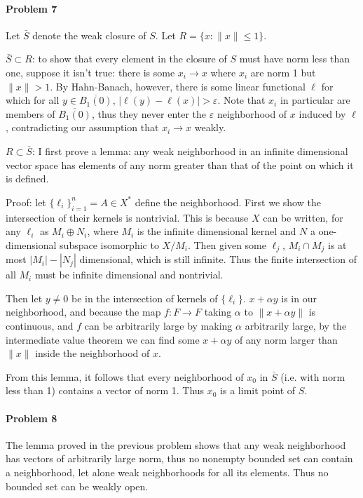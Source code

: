 \documentclass[12pt]{article}
\begin{document}
\paragraph{Problem 7}

Let $\bar{S}$ denote the weak closure of $S$. Let $R = \{x:\|x\| \leq 1\}$.

$\bar{S}\subset R$: to show that every element in the closure of $S$ must have
norm less than one, suppose it isn't true: there is some $x_i \to x$ where
$x_i$ are norm 1 but $\|x\| > 1$. By Hahn-Banach, however, there is some linear
functional $\ell$ for which for all $y \in \overline{B_1(0)}$, $|\ell(y)-\ell(x)
| > \varepsilon$. Note that $x_i$ in particular are members of $\overline{B_1(0)}
$, thus they never enter the $\varepsilon$ neighborhood of $x$ induced by $\ell$,
contradicting our assumption that $x_i\to x$ weakly.

$R\subset \bar{S}$: I first prove a lemma: any weak neighborhood in an infinite
dimensional vector space has elements
of any norm greater than that of the point on which it is defined.

Proof: let $\{\ell_i\}_{i=1}^n = A \in X^*$ define the neighborhood. First we
show the intersection of their kernels is nontrivial. This is because $X$ can
be written, for any $\ell_i$ as $M_i \oplus N_i$, where $M_i$ is the infinite
dimensional kernel and $N$ a one-dimensional subspace isomorphic to $X/M_i$.
Then given some $\ell_j$, $M_i\cap M_j$ is at most $|M_i|-|N_j|$ dimensional,
which is still infinite. Thus the finite intersection of all $M_i$ must be
infinite dimensional and nontrivial.

Then let $y\neq 0$ be in the intersection of kernels of $\{\ell_i\}$. $x
+ \alpha y$ is in our neighborhood, and because the map $f:F\to
F$ taking $\alpha$ to $\|x + \alpha y\|$ is continuous, and $f$
can be arbitrarily large by making $\alpha$ arbitrarily large, by the intermediate
value theorem we can find some $x+\alpha y$ of any norm larger than $\|x\|$
inside the neighborhood of $x$.

From this lemma, it follows that every neighborhood of $x_0$ in $\bar{S}$ (i.e.
with norm less
than 1) contains a vector of norm 1. Thus $x_0$ is a limit point of $S$.

\paragraph{Problem 8}

The lemma proved in the previous problem shows that any weak neighborhood has
vectors of arbitrarily large norm, thus no nonempty bounded set can contain
a neighborhood, let alone weak neighborhoods for all its elements. Thus no
bounded set can be weakly open.
\end{document}
